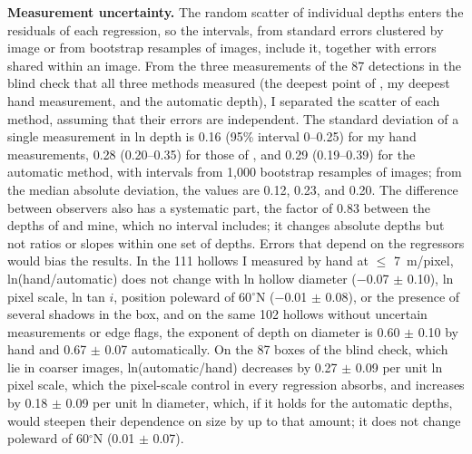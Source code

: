 \documentclass{planetary}
\begin{document}
\textbf{Measurement uncertainty.} The random scatter of individual depths enters the residuals of each regression, so the intervals, from standard errors clustered by image or from bootstrap resamples of images, include it, together with errors shared within an image. From the three measurements of the 87 detections in the blind check that all three methods measured (the deepest point of \textcite{blewett2016}, my deepest hand measurement, and the automatic depth), I separated the scatter of each method, assuming that their errors are independent. The standard deviation of a single measurement in ln depth is 0.16 (95\% interval 0--0.25) for my hand measurements, 0.28 (0.20--0.35) for those of \textcite{blewett2016}, and 0.29 (0.19--0.39) for the automatic method, with intervals from 1,000 bootstrap resamples of images; from the median absolute deviation, the values are 0.12, 0.23, and 0.20. The difference between observers also has a systematic part, the factor of 0.83 between the depths of \textcite{blewett2016} and mine, which no interval includes; it changes absolute depths but not ratios or slopes within one set of depths. Errors that depend on the regressors would bias the results. In the 111 hollows I measured by hand at $\leq$ 7~m/pixel, ln(hand/automatic) does not change with ln hollow diameter ($-$0.07 $\pm$ 0.10), ln pixel scale, ln tan $i$, position poleward of 60$^\circ$N ($-$0.01 $\pm$ 0.08), or the presence of several shadows in the box, and on the same 102 hollows without uncertain measurements or edge flags, the exponent of depth on diameter is 0.60 $\pm$ 0.10 by hand and 0.67 $\pm$ 0.07 automatically. On the 87 boxes of the blind check, which lie in coarser images, ln(automatic/hand) decreases by 0.27 $\pm$ 0.09 per unit ln pixel scale, which the pixel-scale control in every regression absorbs, and increases by 0.18 $\pm$ 0.09 per unit ln diameter, which, if it holds for the automatic depths, would steepen their dependence on size by up to that amount; it does not change poleward of 60$^\circ$N (0.01 $\pm$ 0.07).
\end{document}
